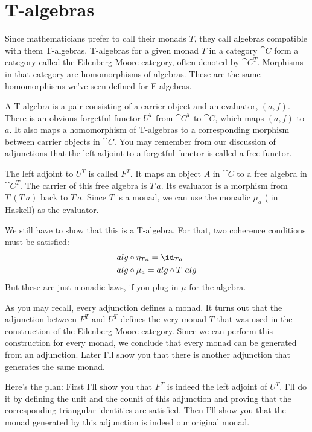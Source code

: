 \section{T-algebras}

Since mathematicians prefer to call their monads $T$, they call
algebras compatible with them T-algebras. T-algebras for a given monad $T$
in a category $\cat{C}$ form a category called the Eilenberg-Moore
category, often denoted by $\cat{C}^T$. Morphisms in that
category are homomorphisms of algebras. These are the same homomorphisms
we've seen defined for F-algebras.

A T-algebra is a pair consisting of a carrier object and an evaluator,
$(a, f)$. There is an obvious forgetful functor $U^T$ from
$\cat{C}^T$ to $\cat{C}$, which maps $(a, f)$ to $a$. It
also maps a homomorphism of T-algebras to a corresponding morphism
between carrier objects in $\cat{C}$. You may remember from our discussion of
adjunctions that the left adjoint to a forgetful functor is called a
free functor.

The left adjoint to $U^T$ is called $F^T$. It maps an object
$A$ in $\cat{C}$ to a free algebra in $\cat{C}^T$. The carrier
of this free algebra is $T\ a$. Its evaluator is a morphism from
$T\ (T\ a)$ back to $T\ a$. Since $T$ is a monad,
we can use the monadic $\mu_a$ ( in Haskell) as the
evaluator.

We still have to show that this is a T-algebra. For that, two coherence
conditions must be satisfied:
\begin{align*}
alg &\circ \eta_{Ta} = \id_{Ta} \\
alg &\circ \mu_a = alg \circ T\ alg
\end{align*}
But these are just monadic laws, if you plug in $\mu$ for the
algebra.

As you may recall, every adjunction defines a monad. It turns out that
the adjunction between $F^T$ and $U^T$
defines the very monad $T$ that was used in the construction of
the Eilenberg-Moore category. Since we can perform this construction for
every monad, we conclude that every monad can be generated from an
adjunction. Later I'll show you that there is another adjunction that
generates the same monad.

Here's the plan: First I'll show you that $F^T$ is indeed the left
adjoint of $U^T$. I'll do it by defining the unit and the counit
of this adjunction and proving that the corresponding triangular
identities are satisfied. Then I'll show you that the monad generated by
this adjunction is indeed our original monad.

